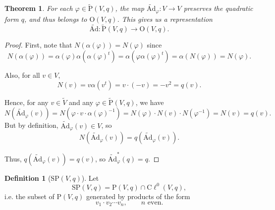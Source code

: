 \documentclass[a4paper]{report}
\newcommand{\cliff}{\mathrm{C}\ell}
\newcommand{\tAd}{\widetilde{\mathrm{Ad}}}
\newcommand{\Or}{\mathrm{O}}
\newcommand{\tP}{\tilde{\mathrm{P}}}
\newcommand{\SP}{\mathrm{SP}}
\theoremstyle{definition}
\newtheorem{definition}{Definition}[section]
\theoremstyle{plain}
\newtheorem{theorem}{Theorem}[section]
\theoremstyle{remark}
\begin{document}
\begin{theorem}
  For each $\varphi \in \tP(V, q)$, the map $\tAd_{\varphi}\colon V \to V$ preserves the quadratic form $q$, and thus belongs to $\Or(V, q)$. This gives us a representation
  \begin{equation*}
    \tAd\colon \tP(V, q) \to \Or(V, q).
  \end{equation*}
\end{theorem}
\begin{proof}
  First, note that $N(\alpha(\varphi)) = N(\varphi)$ since
  \begin{equation*}
    N(\alpha(\varphi)) = \alpha(\varphi) \alpha(\alpha(\varphi)^{t}) = \alpha(\varphi \alpha (\varphi)^{t}) = \alpha(N(\varphi)) = N(\varphi).
  \end{equation*}

  Also, for all $v \in V$, 
  \begin{equation*}
    N(v) = v \alpha(v^{t}) = v\cdot(-v) = -v^2 = q(v).
  \end{equation*}

  Hence, for any $v \in \tilde{V}$ and any $\varphi \in \tP(V, q)$, we have
  \begin{equation*}
    N(\tAd_{\varphi}(v)) = N(\varphi\cdot v\cdot \alpha(\varphi)^{-1}) = N(\varphi)\cdot N(v) \cdot N(\varphi^{-1}) = N(v) = q(v).
  \end{equation*}
  But by definition, $\tAd_{\varphi}(v) \in V$, so
  \begin{equation*}
    N(\tAd_{\varphi}(v)) = q(\tAd_{\varphi}(v)).
  \end{equation*}

  Thus, $q(\tAd_{\varphi}(v)) = q(v)$, so $\tAd_{\varphi}^{*}(q) = q$.
\end{proof}

\begin{definition}[$\SP(V, q)$]
  \label{def:spgroup}
  Let 
  \begin{equation*}
    \SP(V, q) = \mathrm{P}(V, q) \cap \cliff^{0}(V, q),
  \end{equation*}
  i.e. the subset of $\mathrm{P}(V, q)$ generated by products of the form
  \begin{equation*}
    v_{1} \cdot v_{2} \cdots v_{n},\qquad n\text{ even}.
  \end{equation*}
\end{definition}
\end{document}
